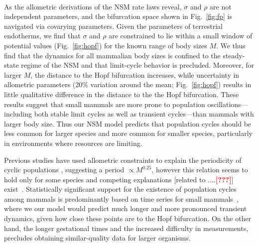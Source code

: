 \documentclass{pnastwo}
\newcommand{\sid}[1]{\textcolor{red}{\bf [#1]}}
\begin{document}
\begin{article}
 \\
As the allometric derivations of the NSM rate laws reveal, $\sigma$ and
$\rho$ are not independent parameters, and the bifurcation space shown in
Fig.~\ref{fig:fp} is navigated via covarying parameters.  Given the
parameters of terrestrial endotherms, we find that $\sigma$ and $\rho$ are
constrained to lie within a small window of potential values
(Fig.~\ref{fig:hopf}) for the known range of body sizes $M$.  We thus find
that the dynamics for all mammalian body sizes is confined to the
steady-state regime of the NSM and that  limit-cycle behavior is precluded.
Moreover, for larger $M$, the distance to the Hopf bifurcation increases,
while uncertainty in allometric parameters (20\% variation around the mean;
Fig.~\ref{fig:hopf}) results in little qualitative difference in the distance
to the the Hopf bifurcation. These results suggest that small mammals are
more prone to population oscillations---including both stable limit cycles as
well as transient cycles---than mammals with larger body size.  Thus our NSM
model predicts that population cycles should be less common for larger
species and more common for smaller species, particularly in environments
where resources are limiting.%

Previous studies have used allometric constraints to explain the periodicity
of cyclic populations
\cite{CalderIII:1983jd,Peterson:1984hj,Krukonis:1991fk}, suggesting a period
$\propto M^{0.25}$, however this relation seems to hold only for some species
\cite{Hendriks:2012fc} and competing explanations [related to ....\sid{???}]
exist~\cite{Kendall:1999iy,Hogstedt:2005cr}.
Statistically significant support for the existence of population cycles
among mammals is predominantly based on time series for small
mammals~\cite{Kendall:1998hl}, where we our model would predict much longer
and more pronounced transient dynamics, given how close these points are to
the Hopf bifurcation.  On the other hand, the longer gestational times and
the increased difficulty in measurements, precludes obtaining similar-quality
data for larger organisms.
\vspace{6mm}


\end{article}
\end{document}
